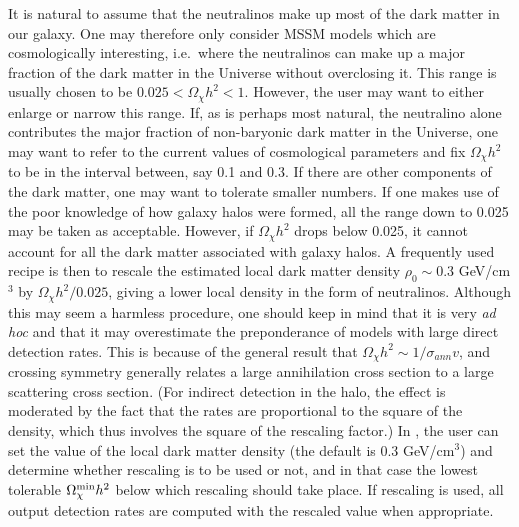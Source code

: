 It is natural to assume that the neutralinos make up most of the dark
matter in our galaxy.  One may therefore only consider MSSM models
which are cosmologically interesting, i.e.\ where the neutralinos can
make up a major fraction of the dark matter in the Universe without
overclosing it.  This range is usually chosen to be $0.025 <
\Omega_{\chi}h^{2} <1$.  However, the user may want to either enlarge
or narrow this range.  If, as is perhaps most natural, the neutralino
alone contributes the major fraction of non-baryonic dark matter in
the Universe, one may want to refer to the current values of
cosmological parameters and fix $\Omega_{\chi}h^{2}$ to be in the
interval between, say 0.1 and 0.3.  If there are other components of
the dark matter, one may want to tolerate smaller numbers.  If one
makes use of the poor knowledge of how galaxy halos were formed, all
the range down to 0.025 may be taken as acceptable.  However, if
$\Omega_{\chi}h^{2}$ drops below 0.025, it cannot account for all the
dark matter associated with galaxy halos.  A frequently used recipe is
then to rescale the estimated local dark matter density $\rho_0\sim
0.3$ GeV/cm$^3$ by $\Omega_{\chi}h^2/0.025$, giving a lower local
density in the form of neutralinos.  Although this may seem a harmless
procedure, one should keep in mind that it is very {\em ad hoc} and
that it may overestimate the preponderance of models with large direct
detection rates.  This is because of the general result that
$\Omega_{\chi}h^{2}\sim 1/\sigma_{ann}v$, and crossing symmetry
generally relates a large annihilation cross section to a large
scattering cross section.  (For indirect detection in the halo, the
effect is moderated by the fact that the rates are proportional to the
square of the density, which thus involves the square of the rescaling
factor.)  In \ds, the user can set the value of the local dark matter
density (the default is $0.3$ GeV/cm$^3$) and determine whether
rescaling is to be used or not, and in that case the lowest tolerable
$\Omega^{\rm min}_{\chi}h^{2}$ below which rescaling should take
place.  If rescaling is used, all output detection rates are computed
with the rescaled value when appropriate.

